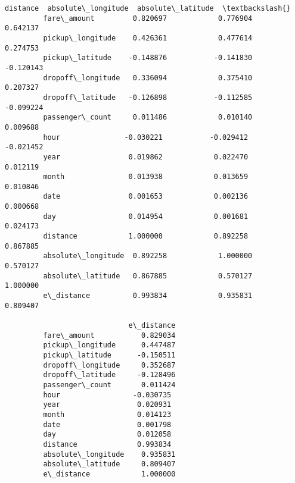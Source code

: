 \documentclass[11pt]{article}
\begin{document}
\begin{Verbatim}[commandchars=\\\{\}]
                             distance  absolute\_longitude  absolute\_latitude  \textbackslash{}
         fare\_amount         0.820697            0.776904           0.642137   
         pickup\_longitude    0.426361            0.477614           0.274753   
         pickup\_latitude    -0.148876           -0.141830          -0.120143   
         dropoff\_longitude   0.336094            0.375410           0.207327   
         dropoff\_latitude   -0.126898           -0.112585          -0.099224   
         passenger\_count     0.011486            0.010140           0.009688   
         hour               -0.030221           -0.029412          -0.021452   
         year                0.019862            0.022470           0.012119   
         month               0.013938            0.013659           0.010846   
         date                0.001653            0.002136           0.000668   
         day                 0.014954            0.001681           0.024173   
         distance            1.000000            0.892258           0.867885   
         absolute\_longitude  0.892258            1.000000           0.570127   
         absolute\_latitude   0.867885            0.570127           1.000000   
         e\_distance          0.993834            0.935831           0.809407   
         
                             e\_distance  
         fare\_amount           0.829034  
         pickup\_longitude      0.447487  
         pickup\_latitude      -0.150511  
         dropoff\_longitude     0.352687  
         dropoff\_latitude     -0.128496  
         passenger\_count       0.011424  
         hour                 -0.030735  
         year                  0.020931  
         month                 0.014123  
         date                  0.001798  
         day                   0.012058  
         distance              0.993834  
         absolute\_longitude    0.935831  
         absolute\_latitude     0.809407  
         e\_distance            1.000000  
\end{Verbatim}
            
\end{document}

